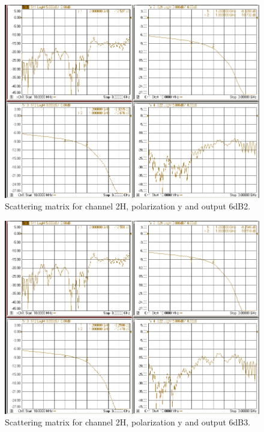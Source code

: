 \documentclass[12pt,a4paper,oneside]{article}
\begin{document}
\begin{figure}[H]
\centering
\includegraphics[width=0.9\linewidth]{VNA_results/2Hy_6dB2.png}
\caption{Scattering matrix for channel 2H, polarization y and output 6dB2.}
\label{fig:2Hy_6dB2}
\end{figure}


\begin{figure}[H]
\centering
\includegraphics[width=0.9\linewidth]{VNA_results/2Hy_6dB3.png}
\caption{Scattering matrix for channel 2H, polarization y and output 6dB3.}
\label{fig:2Hy_6dB3}
\end{figure}
\end{document}
